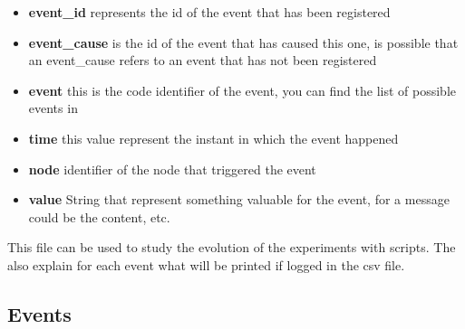 \documentclass[10pt,journal,onecolumn]{IEEEtran}
\begin{document}
\begin{itemize}
	\item \textbf{event\_id} represents the id of the event that has been registered
	\item \textbf{event\_cause} is the id of the event that has caused this one, is possible
		that an event\_cause refers to an event that has not been registered
	\item \textbf{event} this is the code identifier of the event, you can find
		the list of possible events in 
	\item \textbf{time} this value represent the instant in which the event
		happened
	\item \textbf{node} identifier of the node that triggered the event
	\item \textbf{value} String that represent something valuable for the event,
		for a message could be the content, etc.
\end{itemize}

This file can be used to study the evolution of the experiments with scripts.
The  also explain for each event what will be printed
if logged in the csv file.

\subsection{Events}
\label{subsec:events}
\end{document}
